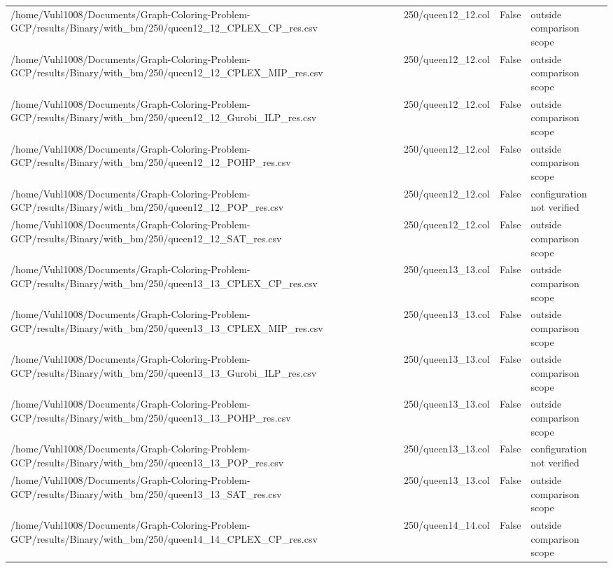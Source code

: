 \begin{table}[htbp]
\begin{tabular}{llll}
/home/Vuhl1008/Documents/Graph-Coloring-Problem-GCP/results/Binary/with\_bm/250/queen12\_12\_CPLEX\_CP\_res.csv & 250/queen12\_12.col & False & outside comparison scope \\
/home/Vuhl1008/Documents/Graph-Coloring-Problem-GCP/results/Binary/with\_bm/250/queen12\_12\_CPLEX\_MIP\_res.csv & 250/queen12\_12.col & False & outside comparison scope \\
/home/Vuhl1008/Documents/Graph-Coloring-Problem-GCP/results/Binary/with\_bm/250/queen12\_12\_Gurobi\_ILP\_res.csv & 250/queen12\_12.col & False & outside comparison scope \\
/home/Vuhl1008/Documents/Graph-Coloring-Problem-GCP/results/Binary/with\_bm/250/queen12\_12\_POHP\_res.csv & 250/queen12\_12.col & False & outside comparison scope \\
/home/Vuhl1008/Documents/Graph-Coloring-Problem-GCP/results/Binary/with\_bm/250/queen12\_12\_POP\_res.csv & 250/queen12\_12.col & False & configuration not verified \\
/home/Vuhl1008/Documents/Graph-Coloring-Problem-GCP/results/Binary/with\_bm/250/queen12\_12\_SAT\_res.csv & 250/queen12\_12.col & False & outside comparison scope \\
/home/Vuhl1008/Documents/Graph-Coloring-Problem-GCP/results/Binary/with\_bm/250/queen13\_13\_CPLEX\_CP\_res.csv & 250/queen13\_13.col & False & outside comparison scope \\
/home/Vuhl1008/Documents/Graph-Coloring-Problem-GCP/results/Binary/with\_bm/250/queen13\_13\_CPLEX\_MIP\_res.csv & 250/queen13\_13.col & False & outside comparison scope \\
/home/Vuhl1008/Documents/Graph-Coloring-Problem-GCP/results/Binary/with\_bm/250/queen13\_13\_Gurobi\_ILP\_res.csv & 250/queen13\_13.col & False & outside comparison scope \\
/home/Vuhl1008/Documents/Graph-Coloring-Problem-GCP/results/Binary/with\_bm/250/queen13\_13\_POHP\_res.csv & 250/queen13\_13.col & False & outside comparison scope \\
/home/Vuhl1008/Documents/Graph-Coloring-Problem-GCP/results/Binary/with\_bm/250/queen13\_13\_POP\_res.csv & 250/queen13\_13.col & False & configuration not verified \\
/home/Vuhl1008/Documents/Graph-Coloring-Problem-GCP/results/Binary/with\_bm/250/queen13\_13\_SAT\_res.csv & 250/queen13\_13.col & False & outside comparison scope \\
/home/Vuhl1008/Documents/Graph-Coloring-Problem-GCP/results/Binary/with\_bm/250/queen14\_14\_CPLEX\_CP\_res.csv & 250/queen14\_14.col & False & outside comparison scope \\

\end{tabular}
\end{table}
